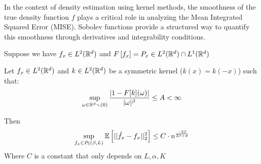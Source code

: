 \documentclass{article}
\begin{document}
   In the context of density estimation using kernel methods, the smoothness of the true density function $f$ plays a critical role in analyzing the Mean Integrated Squared Error (MISE). Sobolev functions provide a structured way to quantify this smoothness through derivatives and integrability conditions.

\begin{example}
    Suppose we have \(f_x \in L^{2}(\mathbb{R}^{d})\) and \(F\left[f_x\right]=P_x \in L^{2}(\mathbb{R}^{d}) \cap L^{1}(\mathbb{R}^{d}) \)
\end{example}


\begin{theorem}
    Let \(f_x \in L^{2}(\mathbb{R}^{d})\) and \(k\in L^{2}(\mathbb{R}^{d})\) be a symmetric kernel (\(k(x)=k(-x)\)) such that: 
    \[
    \sup_{\omega \in \mathbb{R}^{d}\smallsetminus(0)} \frac{|1-F[k](\omega)|}{|\omega|^{\beta}} \leq A < \infty
    \]

    Then \[
        \sup_{f_x \in P_{\mathbb{S}}(\beta, L)} \mathbb{E} \left[||\hat{f}_x - f_x||^{2}_{2}\right] \leq C \cdot n^{\frac{-2\beta}{2\beta + d}} 
    \]
    Where $C$ is a constant that only depends on $L, \alpha, K$
\end{theorem}
\end{document}
